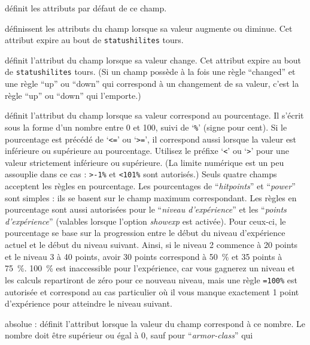 \documentclass[titlepage]{article}
\begin{document}
\begin{description}[font=\mdseries\ttfamily]
\item[always] définit les attributs par défaut de ce champ.
\item[up \textrm{\textmd{et}} down] définissent les attributs du champ
lorsque sa valeur augmente ou diminue. Cet attribut
expire au bout de \texttt{statushilites} tours.
\item[changed] définit l'attribut du champ lorsque sa valeur
change. Cet attribut expire au bout de \texttt{statushilites} tours.
(Si un champ possède à la fois une règle ``changed'' et une règle ``up''
ou ``down'' qui correspond à un changement de sa valeur,
c'est la règle ``up'' ou ``down'' qui l'emporte.)
\item[pourcentage] définit l'attribut du champ lorsque sa valeur
correspond au pourcentage.
Il s'écrit sous la forme d'un nombre entre 0 et 100, suivi de `\texttt{\%}'
(signe pour cent).
Si le pourcentage est précédé de `\texttt{<=}' ou `\texttt{>=}',
il correspond aussi lorsque la valeur est inférieure ou supérieure au pourcentage.
Utilisez le préfixe `\texttt{<}' ou `\texttt{>}' pour une valeur strictement inférieure ou supérieure.
(La limite numérique est un peu assouplie dans ce cas : \texttt{>-1\%}
et \texttt{<101\%} sont autorisés.)
Seuls quatre champs acceptent les règles en pourcentage.
Les pourcentages de ``\textit{hitpoints}'' et ``\textit{power}'' sont
simples : ils se basent sur le champ maximum correspondant.
Les règles en pourcentage sont aussi autorisées pour le ``\textit{niveau d'expérience}''
et les ``\textit{points d'expérience}'' (valables lorsque l'option
\textit{showexp}
est activée).
Pour ceux-ci, le pourcentage se base sur la progression entre le début du
niveau d'expérience actuel et le début du niveau suivant.
Ainsi, si le niveau 2 commence à 20 points et le niveau 3 à 40 points,
avoir 30 points correspond à 50~\% et 35 points à 75~\%.
100~\% est inaccessible pour l'expérience, car vous gagnerez un niveau et
les calculs repartiront de zéro pour ce nouveau niveau, mais une règle
\texttt{=100\%} est autorisée et correspond au cas particulier où il vous manque
exactement 1 point d'expérience pour atteindre le niveau suivant.
\item[valeur] absolue : définit l'attribut lorsque la valeur du champ
correspond à ce nombre.
Le nombre doit être supérieur ou égal à 0, sauf pour ``\textit{armor-class}'' qui

\end{description}
\end{document}
